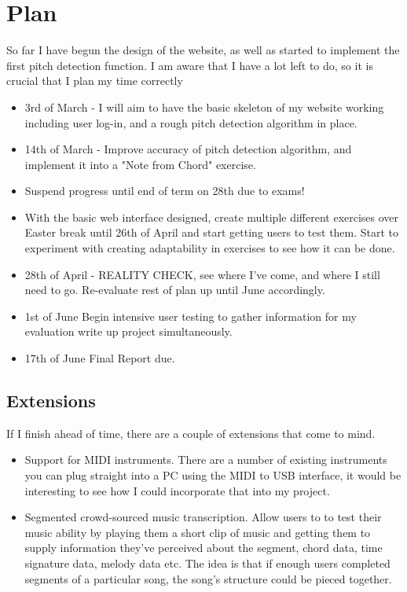 \chapter{Plan}

So far I have begun the design of the website, as well as started to implement the first pitch detection function. I am aware that I have a lot left to do, so it is crucial that I plan my time correctly

\begin{itemize}
	\item 3rd of March - I will aim to have the basic skeleton of my website working including user log-in, and a rough pitch detection algorithm in place.
	\item 14th of March - Improve accuracy of pitch detection algorithm, and implement it into a "Note from Chord" exercise.
	\item Suspend progress until end of term on 28th due to exams!
	\item With the basic web interface designed, create multiple different exercises over Easter break until 26th of April and start getting users to test them. Start to experiment with creating adaptability in exercises to see how it can be done.
	\item 28th of April - REALITY CHECK, see where I've come, and where I still need to go. Re-evaluate rest of plan up until June accordingly.
	\item 1st of June Begin intensive user testing to gather information for my evaluation write up project simultaneously.
	\item 17th of June Final Report due.
\end{itemize}


\section{Extensions}
If I finish ahead of time, there are a couple of extensions that come to mind.
\begin{itemize}
	\item Support for MIDI instruments. There are a number of existing instruments you can plug straight into a PC using the MIDI to USB interface, it would be interesting to see how I could incorporate that into my project.
	\item Segmented crowd-sourced music transcription. Allow users to to test their music ability by playing them a short clip of music and getting them to supply information they've perceived about the segment, chord data, time signature data, melody data etc. The idea is that if enough users completed segments of a particular song, the song's structure could be pieced together.
\end{itemize}
